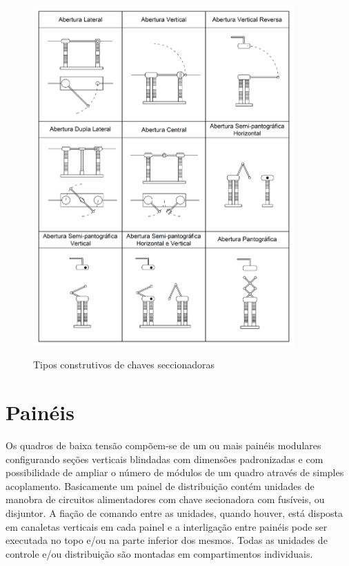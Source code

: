 \documentclass[a5paper,english,spanish,brazil]{ufsc-thesis}
\begin{document}
		\begin{figure}[htb]
		  \caption{Tipos construtivos de chaves seccionadoras}
		  \centering
		  \includegraphics[width=10cm]{chavesec.pdf}
		  \label{fig:chavesec}
		\end{figure}

	\section{Painéis}
		Os quadros de baixa tensão compõem-se de um ou mais painéis modulares configurando seções verticais blindadas com dimensões padronizadas e com possibilidade de ampliar o número de módulos de um quadro através de simples acoplamento. Basicamente um painel de distribuição contém unidades de manobra de circuitos alimentadores com chave secionadora com fusíveis, ou disjuntor. A fiação de comando entre as unidades, quando houver, está disposta em canaletas verticais em cada painel e a interligação entre painéis pode ser executada no topo e/ou na parte inferior dos mesmos. Todas as unidades de controle e/ou distribuição são montadas em compartimentos individuais.
\end{document}
